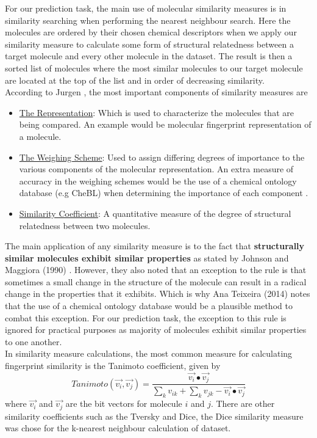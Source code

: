 \documentclass[a4paper,12pt]{report}
\begin{document}
			For our prediction task, the main use of molecular similarity measures is in similarity searching when performing the nearest neighbour search. Here the molecules are ordered by their chosen chemical descriptors when we apply our similarity measure to calculate some form of structural relatedness between a target molecule and every other molecule in the dataset. The result is then a sorted list of molecules where the most similar molecules to our target molecule are located at the top of the list and in order of decreasing similarity.\\
			According to Jurgen \cite{Jurgen2004}, the most important components of similarity measures are
				\begin{itemize}
					\item \underline{The Representation}: Which is used to characterize the molecules that are being compared. An example would be molecular fingerprint representation of a molecule.
					\item \underline{The Weighing Scheme}: Used to assign differing degrees of importance to the various components of the molecular representation. An extra measure of accuracy in the weighing schemes would be the use of a chemical ontology database (e.g CheBL) when determining the importance of each component \cite{AnaPhd2014}.
					\item \underline{Similarity Coefficient}: A quantitative measure of the degree of structural relatedness between two molecules.
				\end{itemize}
			The main application of any similarity measure is to the fact that \textbf{structurally similar molecules exhibit similar properties} as stated by Johnson and Maggiora (1990) \cite{JohnMaggiora1990}. However, they also noted that an exception to the rule is that sometimes a small change in the structure of the molecule can result in a radical change in the properties that it exhibits. Which is why Ana Teixeira (2014) \cite{AnaPhd2014} notes that the use of a chemical ontology database would be a plausible method to combat this exception. For our prediction task, the exception to this rule is ignored for practical purposes as majority of molecules exhibit similar properties to one another.\\
			In similarity measure calculations, the most common measure for calculating fingerprint similarity is the Tanimoto coefficient, given by 
				\begin{equation}
				Tanimoto(\vec{v_i}, \vec{v_j}) = 
				\frac{\vec{v_i}\bullet\vec{v_j}}
				{\sum_{k}v_{ik} + \sum_{k}v_{jk} - \vec{v_i}\bullet\vec{v_j}  } 
				\end{equation}
			where $\vec{v_i}$ and $\vec{v_j}$ are the bit vectors for molecule $i$ and $j$. There are other similarity coefficients such as the Tversky and Dice, the Dice similarity measure was chose for the k-nearest neighbour calculation of dataset.
	
\end{document}
